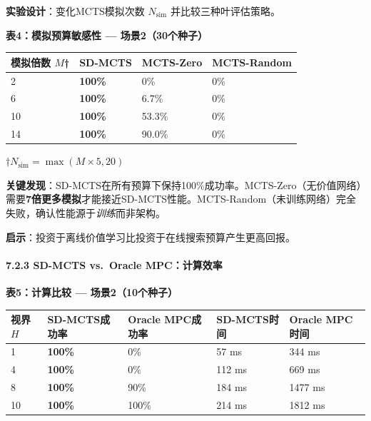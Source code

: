 \documentclass[UTF8]{ctexart}
\let\oldparagraph\paragraph
\renewcommand{\paragraph}[1]{\oldparagraph{#1}\mbox{}}
\begin{document}
\textbf{实验设计}：变化MCTS模拟次数 \(N_{\text{sim}}\)
并比较三种叶评估策略。

\textbf{表4：模拟预算敏感性 --- 场景2（30个种子）}

\begin{table}[h]
\centering
\begin{tabular}{p{4cm}p{3cm}p{3cm}p{3cm}}
\toprule
\textbf{模拟倍数 \(M\)†} & \textbf{SD-MCTS} & \textbf{MCTS-Zero} & \textbf{MCTS-Random} \\
\midrule
2 & \textbf{100\%} & 0\% & 0\% \\
6 & \textbf{100\%} & 6.7\% & 0\% \\
10 & \textbf{100\%} & 53.3\% & 0\% \\
14 & \textbf{100\%} & 90.0\% & 0\% \\
\bottomrule
\end{tabular}
\end{table}

†\(N_{\text{sim}} = \max(M \times 5, 20)\)

\textbf{关键发现}：SD-MCTS在所有预算下保持100\%成功率。MCTS-Zero（无价值网络）需要\textbf{7倍更多模拟}才能接近SD-MCTS性能。MCTS-Random（未训练网络）完全失败，确认性能源于\emph{训练}而非架构。

\textbf{启示}：投资于离线价值学习比投资于在线搜索预算产生更高回报。

\hypertarget{sd-mcts-vs.oracle-mpcux8ba1ux7b97ux6548ux7387}{%
\paragraph{7.2.3 SD-MCTS vs.~Oracle
MPC：计算效率}\label{sd-mcts-vs.oracle-mpcux8ba1ux7b97ux6548ux7387}}

\textbf{表5：计算比较 --- 场景2（10个种子）}

\begin{table}[h]
\centering
\begin{tabular}{p{2cm}p{3.5cm}p{3.5cm}p{3cm}p{3cm}}
\toprule
\textbf{视界 \(H\)} & \textbf{SD-MCTS成功率} & \textbf{Oracle MPC成功率} & \textbf{SD-MCTS时间} & \textbf{Oracle MPC时间} \\
\midrule
1 & \textbf{100\%} & 0\% & 57 ms & 344 ms \\
4 & \textbf{100\%} & 0\% & 112 ms & 669 ms \\
8 & \textbf{100\%} & 90\% & 184 ms & 1477 ms \\
10 & \textbf{100\%} & 100\% & 214 ms & 1812 ms \\
\bottomrule
\end{tabular}
\end{table}
\end{document}
